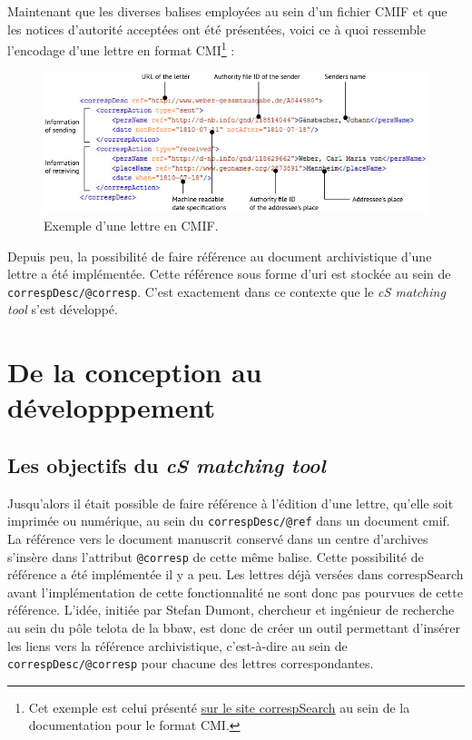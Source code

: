 \documentclass[a4paper, 12pt, twoside]{book}
\begin{document}
Maintenant que les diverses balises employées au sein d'un fichier CMIF et que les notices d'autorité acceptées ont été présentées, voici ce à quoi ressemble l'encodage d'une lettre en format CMI\footnote{Cet exemple est celui présenté \href{https://correspsearch.net/de/dokumentation.html}{sur le site correspSearch} au sein de la documentation pour le format CMI.} :
\begin{figure}[h!]
    \centering
         \includegraphics[scale=0.5]{img/cmif_letter.png}
         \caption{Exemple d'une lettre en CMIF.}
         \label{fig:lettreCMIF}
\end{figure}

Depuis peu, la possibilité de faire référence au document archivistique d'une lettre a été implémentée. Cette référence sous forme d'\gls{uri} est stockée au sein de \texttt{correspDesc/@corresp}. C'est exactement dans ce contexte que le \textit{cS matching tool} s'est développé.


\chapter{De la conception au développpement}
\section{Les objectifs du \textit{cS matching tool}}
\label{sect:objectifcSMT}
Jusqu'alors il était possible de faire référence à l'édition d'une lettre, qu'elle soit imprimée ou numérique, au sein du \texttt{correspDesc/@ref} dans un document \gls{cmif}. La référence vers le document manuscrit conservé dans un centre d'archives s'insère dans l'attribut \texttt{@corresp} de cette même balise. Cette possibilité de référence a été implémentée il y a peu. Les lettres déjà versées dans correspSearch avant l'implémentation de cette fonctionnalité ne sont donc pas pourvues de cette référence. L'idée, initiée par Stefan Dumont, chercheur et ingénieur de recherche au sein du pôle \gls{telota} de la \gls{bbaw}, est donc de créer un outil permettant d'insérer les liens vers la référence archivistique, c'est-à-dire au sein de \texttt{correspDesc/@corresp} pour chacune des lettres correspondantes. 
\end{document}
